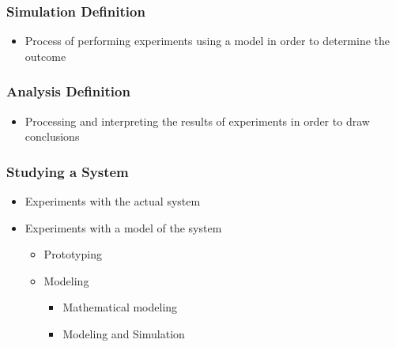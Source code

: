 \documentclass[a4paper]{article}
\begin{document}
	\subsubsection{Simulation Definition}
	\begin{itemize}
		\item Process of performing experiments using a model in order
			to determine the outcome
	\end{itemize}

	\subsubsection{Analysis Definition}
	\begin{itemize}
		\item Processing and interpreting the results of experiments in
			order to draw conclusions
	\end{itemize}

	\subsubsection{Studying a System}
	\begin{itemize}
		\item Experiments with the actual system
		\item Experiments with a model of the system
		\begin{itemize}
			\item Prototyping
			\item Modeling
			\begin{itemize}
				\item Mathematical modeling
				\item Modeling and Simulation
			\end{itemize}
		\end{itemize}
	\end{itemize}
\end{document}
